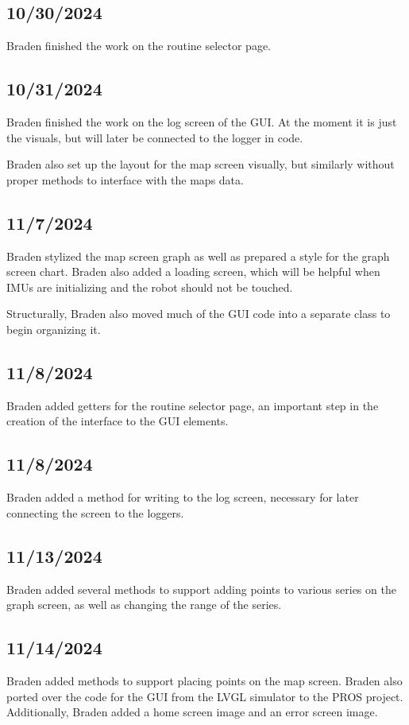 \subsection{10/30/2024}
Braden finished the work on the routine selector page. 

\subsection{10/31/2024}
Braden finished the work on the log screen of the GUI. At the moment it is just the visuals, but will later be connected to the logger in code. 

Braden also set up the layout for the map screen visually, but similarly without proper methods to interface with the maps data.

\subsection{11/7/2024}
Braden stylized the map screen graph as well as prepared a style for the graph screen chart. Braden also added a loading screen, which will be helpful when IMUs are initializing and the robot should not be touched. 

Structurally, Braden also moved much of the GUI code into a separate class to begin organizing it.

\subsection{11/8/2024}
Braden added getters for the routine selector page, an important step in the creation of the interface to the GUI elements. 

\subsection{11/8/2024}
Braden added a method for writing to the log screen, necessary for later connecting the screen to the loggers. 

\subsection{11/13/2024}
Braden added several methods to support adding points to various series on the graph screen, as well as changing the range of the series. 

\subsection{11/14/2024}
Braden added methods to support placing points on the map screen. Braden also ported over the code for the GUI from the LVGL simulator to the PROS project. Additionally, Braden added a home screen image and an error screen image. 

